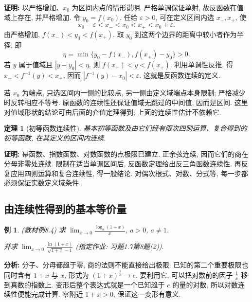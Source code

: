 \documentclass[UTF8,openany]{ctexbook}
\theoremstyle{chinesetextbook}
\newtheorem{example}{例}[section]
\newtheorem{theorem}{定理}[section]
\newenvironment{cnproof}{\par\indent\textbf{证明:} \ignorespaces}{\par}
\begin{document}
\begin{cnproof}
以严格增加、$x_0$ 为区间内点的情形说明. 严格单调保证单射, 故反函数在值域上存在, 并严格增加. 令 $y_0=f(x_0)$. 任给 $\varepsilon>0$, 可在定义区间内选 $x_-,x_+$, 使
\[
x_0-\varepsilon<x_-<x_0<x_+<x_0+\varepsilon.
\]
由严格增加, $f(x_-)<y_0<f(x_+)$. 取 $y_0$ 到这两个边界的距离中较小者作为半径, 即
\[
\eta=\min\{y_0-f(x_-),f(x_+)-y_0\}>0.
\]
若 $y$ 属于值域且 $|y-y_0|<\eta$, 则 $f(x_-)<y<f(x_+)$. 利用单调性反推, 得 $x_-<f^{-1}(y)<x_+$, 因而 $|f^{-1}(y)-x_0|<\varepsilon$. 这就是反函数连续的定义.

若 $x_0$ 为端点, 只选区间内一侧的比较点, 另一侧由定义域端点本身限制; 严格减少时反转相应不等号. 原函数的连续性还保证值域无跳过的中间值, 因而是区间. 这里对值域形状的结论可由后面的介值定理得到; 上面的连续性估计不依赖它.
\end{cnproof}
\begin{theorem}[初等函数连续性]
基本初等函数及由它们经有限次四则运算、复合得到的初等函数, 在其定义的区间内连续.
\end{theorem}
\begin{cnproof}
幂函数、指数函数、对数函数的点极限已建立. 正余弦连续, 因而它们的商在分母非零处连续. 限制在适当单调区间后, 反函数定理给出反三角函数连续性. 再反复应用四则运算和复合连续性, 得一般结论. 对偶次根式、对数、分式等, 每一步都必须保证实数定义域条件.
\end{cnproof}
\subsection{由连续性得到的基本等价量}
\begin{example}
(教材例8.4) 求 $\displaystyle \lim_{x\to0}\frac{\log_a(1+x)}x$, $a>0$, $a\ne1$.

并求 $\displaystyle\lim_{x\to0}\frac{\ln(1+x)}{\sqrt{1+x}-1}$ (指定作业: 习题1.7第8题(2)).
\end{example}
\par\indent\textbf{分析:} 分子、分母都趋于零, 商的法则不能直接给出极限. 已知的第二个重要极限也同时含有 $1+x$ 与 $x$, 形式为 $\displaystyle(1+x)^{\frac1x}\to e$. 要利用它, 可以把对数前的因子 $\displaystyle\frac1x$ 移到真数的指数上. 变形后整个表达式就是一个已知趋于 $e$ 的量的对数, 所以对数连续性便能完成计算. 零附近 $1+x>0$, 保证这一变形有意义.
\end{document}
